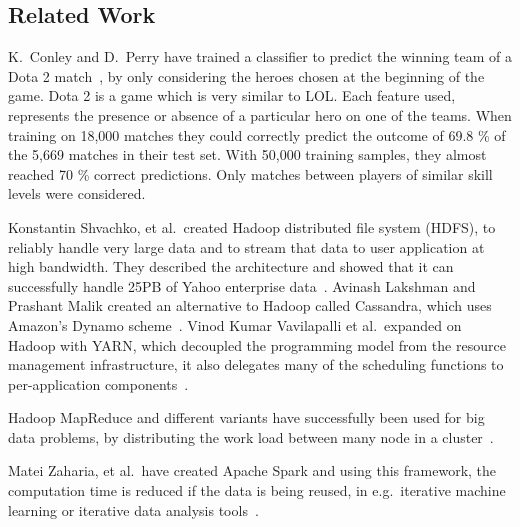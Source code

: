 \subsection{Related Work}\label{sec:relatedwork}
K.\ Conley and D.\ Perry have trained a classifier to predict the winning team of a Dota 2 match~\cite{dota2article}, by only considering the heroes chosen at the beginning of the game. Dota 2 is a game which is very similar to LOL.\@
Each feature used, represents the presence or absence of a particular hero on one of the teams.
When training on 18,000 matches they could correctly predict the outcome of 69.8 \% of the 5,669 matches in their test set.
With 50,000 training samples, they almost reached 70 \% correct predictions. Only matches between players of similar skill levels were considered.

Konstantin Shvachko, et al.\, created Hadoop distributed file system (HDFS), to reliably handle very large data and to stream that data to user application at high bandwidth. They described the architecture and showed that it can successfully handle 25PB of Yahoo enterprise data~\cite{HDFS}.
Avinash Lakshman and Prashant Malik created an alternative to Hadoop called Cassandra, which uses Amazon's Dynamo scheme~\cite{ApacheCassandra}.
Vinod Kumar Vavilapalli et al.\ expanded on Hadoop with YARN, which decoupled the programming model from the resource management infrastructure, it also delegates many of the scheduling functions to per-application components~\cite{ApacheHadoopYARN}.

Hadoop MapReduce and different variants have successfully been used for big data problems, by distributing the work load between many node in a cluster~\cite{DeanMapReduce}. 

Matei Zaharia, et al.\ have created Apache Spark and using this framework, the computation time is reduced if the data is being reused, in e.g.\ iterative machine learning or iterative data analysis tools~\cite{ApacheSpark}.


